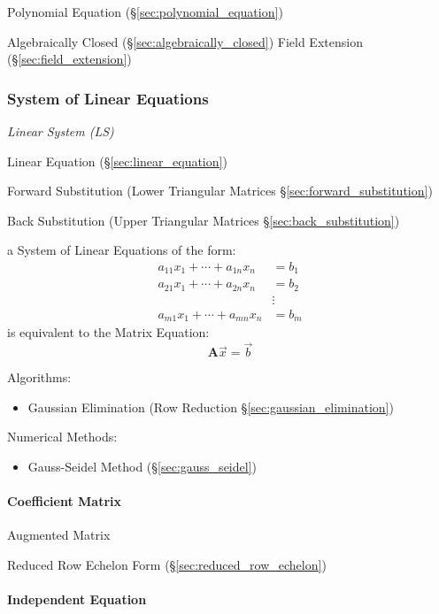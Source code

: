 Polynomial Equation (\S\ref{sec:polynomial_equation})

Algebraically Closed (\S\ref{sec:algebraically_closed}) Field
Extension (\S\ref{sec:field_extension})



\subsubsection{System of Linear Equations}
\label{sec:system_of_linear_equations}

\emph{Linear System (LS)}

Linear Equation (\S\ref{sec:linear_equation})

Forward Substitution (Lower Triangular Matrices
\S\ref{sec:forward_substitution})

Back Substitution (Upper Triangular Matrices \S\ref{sec:back_substitution})

a System of Linear Equations of the form:
\begin{align*}
  a_{11}x_1 + \cdots + a_{1n}x_n & = b_1 \\
  a_{21}x_1 + \cdots + a_{2n}x_n & = b_2 \\
                                 & \vdots \\
  a_{m1}x_1 + \cdots + a_{mn}x_n & = b_m
\end{align*}
is equivalent to the Matrix Equation:
\[
  \mathbf{A}\vec{x} = \vec{b}
\]

Algorithms:
\begin{itemize}
  \item Gaussian Elimination (Row Reduction \S\ref{sec:gaussian_elimination})
\end{itemize}

Numerical Methods:
\begin{itemize}
  \item Gauss-Seidel Method (\S\ref{sec:gauss_seidel})
\end{itemize}



\paragraph{Coefficient Matrix}\label{sec:coefficient_matrix}\hfill

Augmented Matrix

Reduced Row Echelon Form (\S\ref{sec:reduced_row_echelon})



\paragraph{Independent Equation}\label{sec:independent_equation}\hfill

